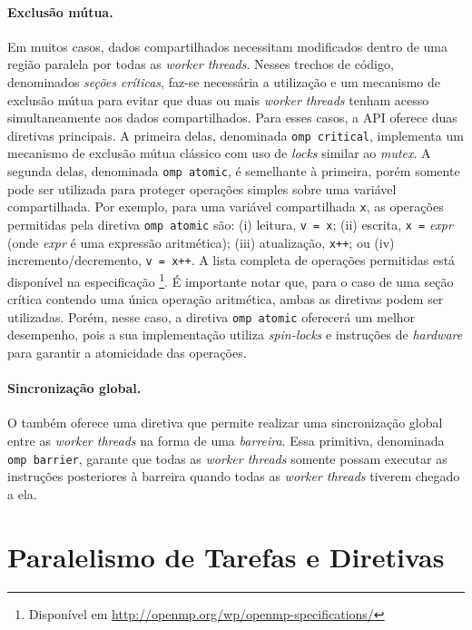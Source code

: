\documentclass{SBCbookchapter}
\begin{document}
		\paragraph{Exclusão mútua.} Em muitos casos, dados
		compartilhados necessitam modificados dentro de uma região
		paralela por todas as \textit{worker threads}. Nesses trechos de
		código, denominados \textit{seções críticas}, faz-se necessária
		a utilização e um mecanismo de exclusão mútua para evitar que
		duas ou mais \textit{worker threads} tenham acesso
		simultaneamente aos dados compartilhados.  Para esses casos, a
		API \openmp oferece duas diretivas principais. A primeira delas,
		denominada \texttt{omp critical}, implementa um mecanismo de
		exclusão mútua clássico com uso de \textit{locks} similar ao
		\textit{mutex}. A segunda delas, denominada \texttt{omp atomic},
		é semelhante à primeira, porém somente pode ser utilizada para
		proteger operações simples sobre uma variável compartilhada.
		Por exemplo, para uma variável compartilhada \texttt{x}, as
		operações permitidas pela diretiva \texttt{omp atomic} são: (i)
		leitura, \eg \texttt{v = x}; (ii) escrita, \eg \texttt{x =}
		\textit{expr} (onde \textit{expr} é uma expressão aritmética);
		(iii) atualização, \eg \texttt{x++}; ou (iv)
		incremento/decremento, \eg \texttt{v = x++}. A lista completa de
		operações permitidas está disponível na especificação
		\openmp\footnote{Disponível em
		\url{http://openmp.org/wp/openmp-specifications/}}.  É
		importante notar que, para o caso de uma seção crítica contendo
		uma única operação aritmética, ambas as diretivas podem ser
		utilizadas. Porém, nesse caso, a diretiva \texttt{omp atomic}
		oferecerá um melhor desempenho, pois a sua implementação utiliza
		\textit{spin-locks} e instruções de \textit{hardware} para
		garantir a atomicidade das operações.
		
		\paragraph{Sincronização global.} O \openmp também oferece uma
		diretiva que permite realizar uma sincronização global entre as
		\textit{worker threads} na forma de uma \textit{barreira}. Essa
		primitiva, denominada \texttt{omp barrier}, garante que todas as
		\textit{worker threads} somente possam executar as instruções
		posteriores à barreira quando todas as \textit{worker threads}
		tiverem chegado a ela.
	
\section{Paralelismo de Tarefas e Diretivas \openmp}
\label{sec:paralelismo tarefas}
\end{document}
